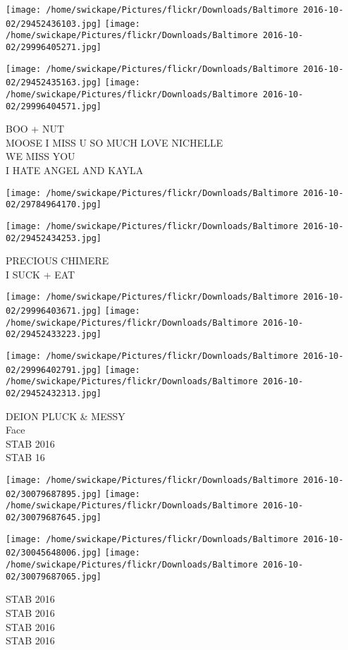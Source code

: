 \documentclass[10pt,letterpaper]{article}
\begin{document}
\texttt{[image: /home/swickape/Pictures/flickr/Downloads/Baltimore 2016-10-02/29452436103.jpg]}
\texttt{[image: /home/swickape/Pictures/flickr/Downloads/Baltimore 2016-10-02/29996405271.jpg]}

\texttt{[image: /home/swickape/Pictures/flickr/Downloads/Baltimore 2016-10-02/29452435163.jpg]}
\texttt{[image: /home/swickape/Pictures/flickr/Downloads/Baltimore 2016-10-02/29996404571.jpg]}

BOO + NUT\\
MOOSE I MISS U SO MUCH LOVE NICHELLE\\
WE MISS YOU\\
I HATE ANGEL AND KAYLA
\pagebreak

\texttt{[image: /home/swickape/Pictures/flickr/Downloads/Baltimore 2016-10-02/29784964170.jpg]}

\vspace{0.25in}
\texttt{[image: /home/swickape/Pictures/flickr/Downloads/Baltimore 2016-10-02/29452434253.jpg]}

PRECIOUS CHIMERE\\
I SUCK + EAT
\pagebreak

\texttt{[image: /home/swickape/Pictures/flickr/Downloads/Baltimore 2016-10-02/29996403671.jpg]}
\texttt{[image: /home/swickape/Pictures/flickr/Downloads/Baltimore 2016-10-02/29452433223.jpg]}

\texttt{[image: /home/swickape/Pictures/flickr/Downloads/Baltimore 2016-10-02/29996402791.jpg]}
\texttt{[image: /home/swickape/Pictures/flickr/Downloads/Baltimore 2016-10-02/29452432313.jpg]}

DEION PLUCK \& MESSY\\
Face\\
STAB 2016\\
STAB 16
\pagebreak

\texttt{[image: /home/swickape/Pictures/flickr/Downloads/Baltimore 2016-10-02/30079687895.jpg]}
\texttt{[image: /home/swickape/Pictures/flickr/Downloads/Baltimore 2016-10-02/30079687645.jpg]}

\texttt{[image: /home/swickape/Pictures/flickr/Downloads/Baltimore 2016-10-02/30045648006.jpg]}
\texttt{[image: /home/swickape/Pictures/flickr/Downloads/Baltimore 2016-10-02/30079687065.jpg]}

STAB 2016\\
STAB 2016\\
STAB 2016\\
STAB 2016
\pagebreak
\end{document}
